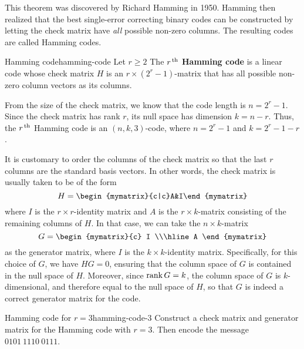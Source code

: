 This theorem was discovered by Richard Hamming%
%
 in 1950. Hamming then realized that the best
single-error correcting binary codes can be constructed by letting the
check matrix have {\em all} possible non-zero columns. The resulting
codes are called Hamming codes.

\begin{definition}{Hamming code}{hamming-code}
  Let $r\geq 2$ The $r^{\,\rm th}$ \textbf{Hamming code}%
   is a linear code whose check matrix
  $H$ is an $r\times (2^r-1)$-matrix that has all possible non-zero
  column vectors as its columns.
\end{definition}

From the size of the check matrix, we know that the code length is
$n=2^r-1$. Since the check matrix has rank $r$, its null space has
dimension $k=n-r$. Thus, the $r^{\,\rm th}$ Hamming code is an $(n,k,3)$-code,
where $n=2^r-1$ and $k=2^r-1-r$.

It is customary to order the columns of the check matrix so that the
last $r$ columns are the standard basis vectors. In other words, the
check matrix is usually taken to be of the form
\begin{equation*}
  H=\begin{mymatrix}{c|c}A&I\end{mymatrix}
\end{equation*}
where $I$ is the $r\times r$-identity matrix and $A$ is the
$r\times k$-matrix consisting of the remaining columns of $H$. In that
case, we can take the $n\times k$-matrix
\begin{equation*}
  G = \begin{mymatrix}{c} I \\\hline A \end{mymatrix}
\end{equation*}
as the generator matrix, where $I$ is the $k\times k$-identity
matrix. Specifically, for this choice of $G$, we have $HG=0$, ensuring
that the column space of $G$ is contained in the null space of
$H$. Moreover, since $\rank G = k$, the column space of $G$ is
$k$-dimensional, and therefore equal to the null space of $H$, so that
$G$ is indeed a correct generator matrix for the code.

\begin{example}{Hamming code for $r=3$}{hamming-code-3}
  Construct a check matrix and generator matrix for the Hamming code
  with $r=3$. Then encode the message $0101~1110~0111$.
\end{example}

